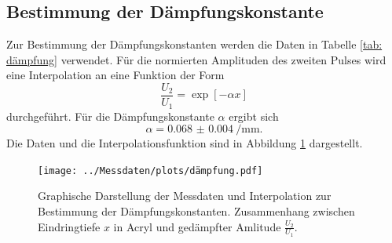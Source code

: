\subsection{Bestimmung der Dämpfungskonstante}
Zur Bestimmung der Dämpfungskonstanten werden die Daten in Tabelle \ref{tab: dämpfung} verwendet.
Für die normierten Amplituden des zweiten Pulses wird eine Interpolation an eine Funktion der Form
\begin{equation}
  \frac{U_2}{U_1} = \exp\left[- \alpha x\right]
\end{equation}
durchgeführt. Für die Dämpfungskonstante $\alpha$ ergibt sich
\begin{equation}
  \alpha = \SI{0.068(4)}{\per\milli\meter}.
\end{equation}
Die Daten und die Interpolationsfunktion sind in Abbildung \ref{fig: dämpfung} dargestellt.



\begin{figure}[H]
  \centering
  \texttt{[image: ../Messdaten/plots/dämpfung.pdf]}
  \caption{Graphische Darstellung der Messdaten und Interpolation zur Bestimmung der Dämpfungskonstanten. Zusammenhang zwischen
  Eindringtiefe $x$ in Acryl und gedämpfter Amlitude $\frac{U_2}{U_1}$.}
  \label{fig: dämpfung}
\end{figure}

